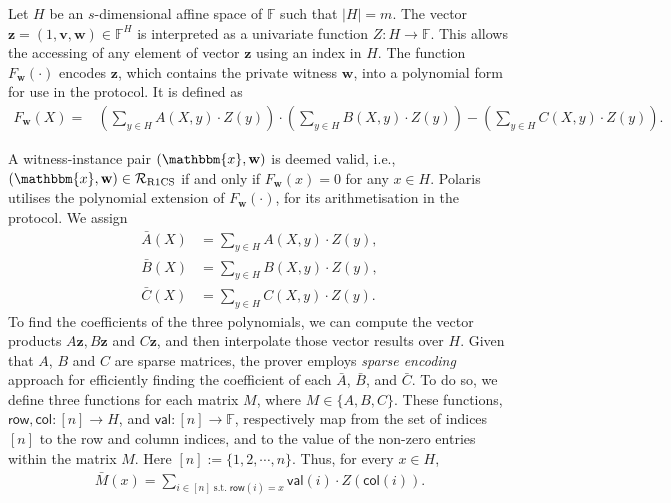Let $H$ be an $s$-dimensional affine space of $\mathbb{F}$ such that $|H|=m$. The vector $\textbf{z}=(1,\textbf{v},\textbf{w}) \in \mathbb{F}^H$ is interpreted as a univariate function $Z: H\rightarrow\mathbb{F}$. This allows the accessing of any element of vector $\textbf{z}$ using an index in $H$.
The function $F_{\textbf{w}}(\cdot)$ encodes $\textbf{z}$, which contains the private witness $\textbf{w}$, 
into a polynomial form for use in the protocol. It is defined as
\begin{align*}
	F_\textbf{w}(X)= & \left(\sum_{y\in H}A(X,y)\cdot Z(y)\right)\cdot\left(\sum_{y\in H} B(X,y)\cdot Z(y)\right)
	- \left(\sum_{y\in H}C(X,y)\cdot Z(y)\right).
\end{align*}

A witness-instance pair $(\mathbbm{x},\textbf{w})$ is deemed valid, i.e., $(\mathbbm{x},\textbf{w})\in\mathcal{R}_{\mathrm{R1CS}}$ if and only if $F_\textbf{w}(x)=0$ for any $x\in H$. Polaris utilises the polynomial extension of $F_\textbf{w}(\cdot)$, for its arithmetisation in the protocol. We assign
\begin{align*}
	\bar{A}(X) & =  \sum_{y\in H}A(X,y)\cdot Z(y), \\
	\bar{B}(X) &=  \sum_{y\in H}B(X,y)\cdot Z(y), \\
	\bar{C}(X) &=  \sum_{y\in H}C(X,y)\cdot Z(y).
\end{align*}
To find the coefficients of the three polynomials, we can compute the vector products $A\mathbf{z}, B\mathbf{z}$ and $C\mathbf{z}$, and then interpolate those vector results over $H$. Given that \(A\), \(B\) and \(C\) are sparse matrices, the prover employs \textit{sparse encoding} approach for efficiently finding the coefficient of each $\bar{A}$, $\bar{B}$, and $\bar{C}$. To do so, we define three functions for each matrix \(M\), where \(M \in \{A, B, C\}\). These functions, $\mathsf{row}, \mathsf{col}:[n]\to H$, and \(\mathsf{val}:[n]\to\mathbb{F}\), respectively map from the set of indices \([n]\) to the row and column indices, and to the value of the non-zero entries within the matrix \(M\). Here $[n]:= \{1,2,\cdots, n\}$. Thus, for every $x\in H$,
\begin{align*}
	\bar{M}(x) = \sum_{i\in[n]\;\mathrm{s.t.}\;\mathsf{row}(i)=x} \mathsf{val}(i)\cdot Z(\mathsf{col}(i)).
\end{align*}


